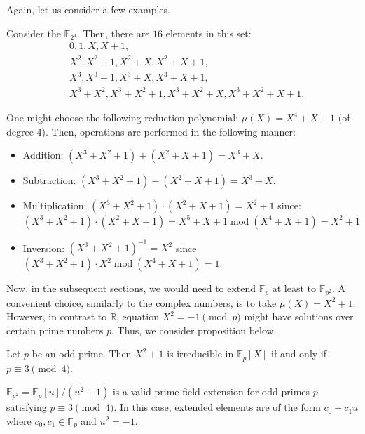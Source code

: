 \documentclass[../lecture-notes-148x210.tex]{subfiles}
\begin{document}
Again, let us consider a few examples.

\begin{example}
    Consider the $\mathbb{F}_{2^4}$. Then, there are $16$ elements in this set:
    \begin{equation*}
        \begin{aligned}
            &0, 1, X, X+1,\\ &X^2, X^2+1, X^2+X, X^2+X+1,\\
            &X^3, X^3+1, X^3+X, X^3+X+1,\\ &X^3+X^2, X^3+X^2+1, X^3+X^2+X, X^3+X^2+X+1.
        \end{aligned}
    \end{equation*}

    One might choose the following reduction polynomial: $\mu(X)=X^4+X+1$ (of degree $4$). Then, operations are performed in the following manner:
    \begin{itemize}
        \item Addition: $(X^3+X^2+1)+(X^2+X+1) = X^3+X$.
        \item Subtraction: $(X^3+X^2+1)-(X^2+X+1) = X^3+X$.
        \item Multiplication: $(X^3+X^2+1)\cdot(X^2+X+1)=X^2+1$ since:
        \begin{equation*}
            (X^3+X^2+1)\cdot(X^2+X+1) = X^5+X+1 \; \text{mod} \; (X^4+X+1) = X^2+1
        \end{equation*}
        \item Inversion: $(X^3+X^2+1)^{-1}=X^2$ since $(X^3+X^2+1)\cdot X^2 \; \text{mod} \; (X^4+X+1) = 1$.
    \end{itemize}
\end{example}

Now, in the subsequent sections, we would need to extend $\mathbb{F}_p$ at least to $\mathbb{F}_{p^2}$. A convenient choice, similarly to the complex numbers, is to take $\mu(X)=X^2+1$. However, in contrast to $\mathbb{R}$, equation $X^2=-1 \pmod{p}$ might have solutions over certain prime numbers $p$. Thus, we consider proposition below.

\begin{proposition}
    Let $p$ be an odd prime. Then $X^2+1$ is irreducible in $\mathbb{F}_p[X]$ if and only if $p \equiv 3 \pmod{4}$.
\end{proposition}

\begin{corollary}
    $\mathbb{F}_{p^2} = \mathbb{F}_p[u]/(u^2+1)$ is a valid prime field extension for odd primes $p$ satisfying $p \equiv 3 \pmod{4}$. In this case, extended elements are of the form $c_0+c_1u$ where $c_0,c_1 \in \mathbb{F}_p$ and $u^2=-1$.
\end{corollary}
\end{document}
